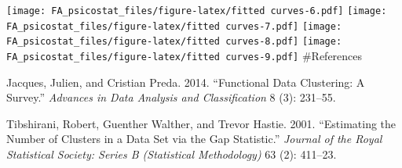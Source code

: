 \documentclass[]{article}
\newenvironment{Shaded}{\begin{snugshade}}{\end{snugshade}}
\newcommand{\ControlFlowTok}[1]{\textcolor[rgb]{0.13,0.29,0.53}{\textbf{#1}}}
\newcommand{\DataTypeTok}[1]{\textcolor[rgb]{0.13,0.29,0.53}{#1}}
\newcommand{\DecValTok}[1]{\textcolor[rgb]{0.00,0.00,0.81}{#1}}
\newcommand{\FloatTok}[1]{\textcolor[rgb]{0.00,0.00,0.81}{#1}}
\newcommand{\KeywordTok}[1]{\textcolor[rgb]{0.13,0.29,0.53}{\textbf{#1}}}
\newcommand{\NormalTok}[1]{#1}
\newcommand{\OperatorTok}[1]{\textcolor[rgb]{0.81,0.36,0.00}{\textbf{#1}}}
\newcommand{\StringTok}[1]{\textcolor[rgb]{0.31,0.60,0.02}{#1}}
\begin{document}
\begin{Shaded}
\end{Shaded}

\texttt{[image: FA\_psicostat\_files/figure-latex/fitted curves-6.pdf]}
\texttt{[image: FA\_psicostat\_files/figure-latex/fitted curves-7.pdf]}
\texttt{[image: FA\_psicostat\_files/figure-latex/fitted curves-8.pdf]}
\texttt{[image: FA\_psicostat\_files/figure-latex/fitted curves-9.pdf]}
\#References

\hypertarget{refs}{}
\leavevmode\hypertarget{ref-jacques2014}{}%
Jacques, Julien, and Cristian Preda. 2014. ``Functional Data Clustering:
A Survey.'' \emph{Advances in Data Analysis and Classification} 8 (3):
231--55.

\leavevmode\hypertarget{ref-tibshirani2001estimating}{}%
Tibshirani, Robert, Guenther Walther, and Trevor Hastie. 2001.
``Estimating the Number of Clusters in a Data Set via the Gap
Statistic.'' \emph{Journal of the Royal Statistical Society: Series B
(Statistical Methodology)} 63 (2): 411--23.
\end{document}
